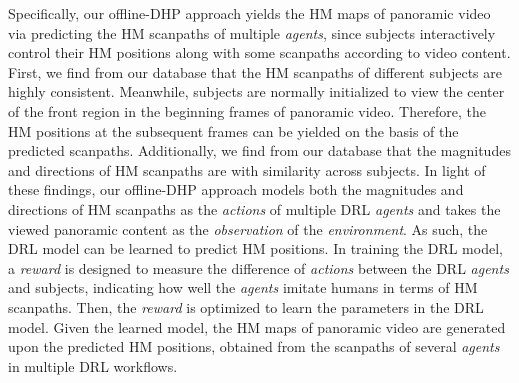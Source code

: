 \documentclass[10pt,journal,compsoc]{IEEEtran}
\begin{document}
Specifically, our offline-DHP approach yields the HM maps of panoramic video via predicting the HM scanpaths of multiple \textit{agents}, since subjects interactively control their HM positions along with some scanpaths according to video content.
First, we find from our database that the HM scanpaths of different subjects are highly consistent.
Meanwhile, subjects are normally initialized to view the center of the front region in the beginning frames of panoramic video.
Therefore, the HM positions at the subsequent frames can be yielded on the basis of the predicted scanpaths.
Additionally, we find from our database that the magnitudes and directions of HM scanpaths are with similarity across subjects.
In light of these findings, our offline-DHP approach models both the magnitudes and directions of HM scanpaths as the \textit{actions} of multiple DRL \textit{agents} and takes the viewed panoramic content as the \textit{observation} of the \textit{environment}.
As such, the DRL model can be learned to predict HM positions.
In training the DRL model, a \textit{reward} is designed to measure the difference of \textit{actions}  between the DRL \textit{agents} and subjects, indicating how well the \textit{agents} imitate humans in terms of HM scanpaths.
Then, the \textit{reward} is optimized to learn the parameters in the DRL model.
Given the learned model, the HM maps of panoramic video are generated upon the predicted HM positions, obtained from the scanpaths of several \textit{agents} in multiple DRL workflows.

\end{document}

